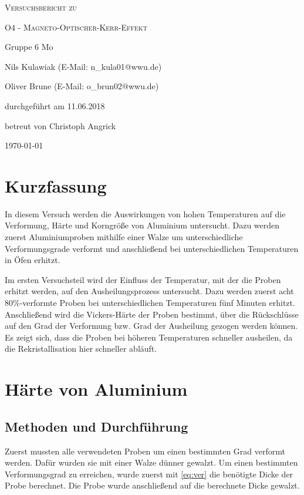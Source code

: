 \documentclass[
	a4paper,
	12pt,
	pagesize,
	ngerman
]{scrartcl}
\begin{document}
\begin{titlepage}
	\centering
	{\scshape\LARGE Versuchsbericht zu \par}
	\vspace{1cm}
	{\scshape\huge O4 - Magneto-Optischer-Kerr-Effekt \par}
	\vspace{2.5cm}
	{\LARGE Gruppe 6 Mo\par}
	\vspace{0.5cm}
	{\large Nils Kulawiak (E-Mail: n\_kula01@wwu.de) \par}
	{\large Oliver Brune (E-Mail: o\_brun02@wwu.de) \par}
	\vfill
	durchgeführt am 11.06.2018\par
	
	\vfill
	betreut von Christoph Angrick
	{\large \today\par}
\end{titlepage}

\tableofcontents
		
\newpage
\section{Kurzfassung}
In diesem Versuch werden die Auswirkungen von hohen Temperaturen auf die Verformung, Härte und Korngröße von Aluminium untersucht. Dazu werden zuerst Aluminiumproben mithilfe einer Walze um unterschiedliche Verformungsgrade verformt und anschließend bei unterschiedlichen Temperaturen in Öfen erhitzt.

Im ersten Versuchsteil wird der Einfluss der Temperatur, mit der die Proben erhitzt werden, auf den Ausheilungsprozess untersucht. Dazu werden zuerst acht $80\%$-verformte Proben bei unterschiedlichen Temperaturen fünf Minuten erhitzt. Anschließend wird die Vickers-Härte der Proben bestimmt, über die Rückschlüsse auf den Grad der Verformung bzw. Grad der Ausheilung gezogen werden können. Es zeigt sich, dass die Proben bei höheren Temperaturen schneller ausheilen, da die Rekristallisation hier schneller abläuft.
\section{Härte von Aluminium}
\subsection{Methoden und Durchführung}
Zuerst mussten alle verwendeten Proben um einen bestimmten Grad verformt werden. Dafür wurden sie mit einer Walze dünner gewalzt. Um einen bestimmten Verformungsgrad zu erreichen, wurde zuerst mit \cref{eq:ver} die benötigte Dicke der Probe berechnet. Die Probe wurde anschließend auf die berechnete Dicke gewalzt.
\end{document}
